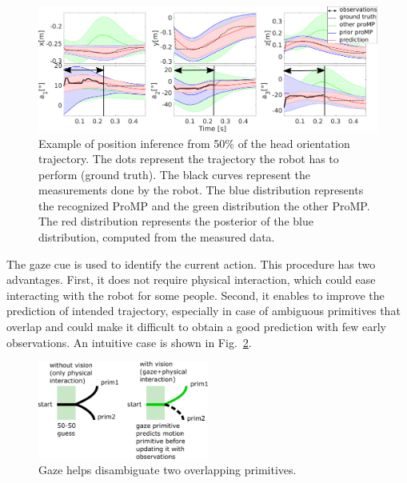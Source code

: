 \documentclass[runningheads,a4paper]{llncs}
\begin{document}
\begin{figure}
  \centering
\includegraphics[width=\hsize]{figures/visionN.pdf}%

\caption{Example of position inference from 50\% of the head orientation trajectory.\label{fig:infgaze} The dots represent the trajectory the robot has to perform (ground truth). The black curves represent the measurements done by the robot. The blue distribution represents the recognized ProMP and the green distribution the other ProMP. The red distribution represents the posterior of the blue distribution, computed from the measured data.}
\end{figure} 

The gaze cue is used to identify the current action. This procedure has two advantages. First, it does not require physical interaction, which could ease interacting with the robot for some people. Second, it enables to improve the prediction of intended trajectory, especially in case of ambiguous primitives that overlap and could make it difficult to obtain a good prediction with few early observations. An intuitive case is shown in Fig.~\ref{fig:intuition}.

\begin{figure} 
\hspace{2pt}
\vspace{-40pt}
  \begin{center}
    \includegraphics[width=0.5\textwidth]{figures/intuition.pdf}%
    \caption{Gaze helps disambiguate two overlapping primitives.}
    \label{fig:intuition}
  \end{center}
  \vspace{-30pt}
\end{figure} 
\end{document}
